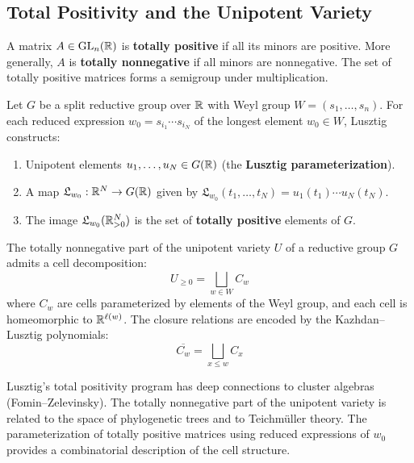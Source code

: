 \subsection{Total Positivity and the Unipotent Variety}

\begin{definition}
A matrix $A \in \operatorname{GL}_n(\mathbb{R})$ is \textbf{totally positive} if all its minors are positive. More generally, $A$ is \textbf{totally nonnegative} if all minors are nonnegative. The set of totally positive matrices forms a semigroup under multiplication.
\end{definition}

\begin{theorem}
Let $G$ be a split reductive group over $\mathbb{R}$ with Weyl group $W = (s_1, \ldots, s_n)$. For each reduced expression $w_0 = s_{i_1} \cdots s_{i_N}$ of the longest element $w_0 \in W$, Lusztig constructs:
\begin{enumerate}
    \item Unipotent elements $u_1, \ldots, u_N \in G(\mathbb{R})$ (the \textbf{Lusztig parameterization}).
    \item A map $\mathfrak{L}_{w_0}: \mathbb{R}^N \to G(\mathbb{R})$ given by $\mathfrak{L}_{w_0}(t_1, \ldots, t_N) = u_1(t_1) \cdots u_N(t_N)$.
    \item The image $\mathfrak{L}_{w_0}(\mathbb{R}_{>0}^N)$ is the set of \textbf{totally positive} elements of $G$.
\end{enumerate}
\end{theorem}

\begin{theorem}
The totally nonnegative part of the unipotent variety $U$ of a reductive group $G$ admits a cell decomposition:
\[
U_{\geq 0} = \bigsqcup_{w \in W} C_w
\]
where $C_w$ are cells parameterized by elements of the Weyl group, and each cell is homeomorphic to $\mathbb{R}^{\ell(w)}$. The closure relations are encoded by the Kazhdan--Lusztig polynomials:
\[
\overline{C_w} = \bigsqcup_{x \leq w} C_x
\]
\end{theorem}

\begin{remark}
Lusztig's total positivity program has deep connections to cluster algebras (Fomin--Zelevinsky). The totally nonnegative part of the unipotent variety is related to the space of phylogenetic trees and to Teichm\"uller theory. The parameterization of totally positive matrices using reduced expressions of $w_0$ provides a combinatorial description of the cell structure.
\end{remark}

